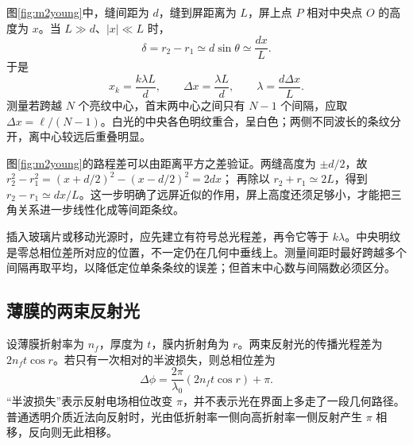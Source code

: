 图\ref{fig:m2young}中，缝间距为 \(d\)，缝到屏距离为 \(L\)，屏上点 \(P\) 相对中央点 \(O\) 的高度为 \(x\)。当 \(L\gg d\)、\(|x|\ll L\) 时，
\[
 \delta=r_2-r_1\simeq d\sin\theta\simeq\frac{dx}{L}.
\]
于是
\[
 x_k=\frac{k\lambda L}{d},\qquad
 \boxed{\Delta x=\frac{\lambda L}{d}},\qquad
 \lambda=\frac{d\Delta x}{L}.
\]
测量若跨越 \(N\) 个亮纹中心，首末两中心之间只有 \(N-1\) 个间隔，应取 \(\Delta x=\ell/(N-1)\)。白光的中央各色明纹重合，呈白色；两侧不同波长的条纹分开，离中心较远后重叠明显。

图\ref{fig:m2young}的路程差可以由距离平方之差验证。两缝高度为 $\pm d/2$，故
$r_2^2-r_1^2=(x+d/2)^2-(x-d/2)^2=2dx$；
再除以 $r_2+r_1\simeq2L$，得到 $r_2-r_1\simeq dx/L$。这一步明确了远屏近似的作用，屏上高度还须足够小，才能把三角关系进一步线性化成等间距条纹。

插入玻璃片或移动光源时，应先建立有符号总光程差，再令它等于 $k\lambda$。中央明纹是零总相位差所对应的位置，不一定仍在几何中垂线上。测量间距时最好跨越多个间隔再取平均，以降低定位单条条纹的误差；但首末中心数与间隔数必须区分。

\subsection{薄膜的两束反射光}

设薄膜折射率为 \(n_f\)，厚度为 \(t\)，膜内折射角为 \(r\)。两束反射光的传播光程差为 \(2n_ft\cos r\)。若只有一次相对的半波损失，则总相位差为
\[
 \Delta\phi=\frac{2\pi}{\lambda_0}(2n_ft\cos r)+\pi.
\]
“半波损失”表示反射电场相位改变 \(\pi\)，并不表示光在界面上多走了一段几何路径。普通透明介质近法向反射时，光由低折射率一侧向高折射率一侧反射产生 \(\pi\) 相移，反向则无此相移。

